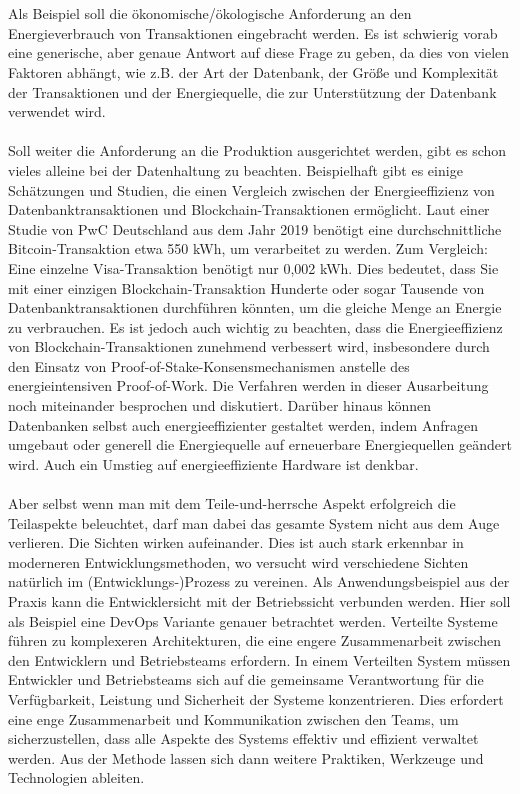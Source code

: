 \\\\
Als Beispiel soll die ökonomische/ökologische Anforderung an den Energieverbrauch von Transaktionen eingebracht werden. Es ist schwierig vorab eine generische, aber genaue Antwort auf diese Frage zu geben, da dies von vielen Faktoren abhängt, wie z.B. der Art der Datenbank, der Größe und Komplexität der Transaktionen und der Energiequelle, die zur Unterstützung der Datenbank verwendet wird.
\\\\
Soll weiter die Anforderung an die  Produktion ausgerichtet werden, gibt es schon vieles alleine bei der Datenhaltung zu beachten. Beispielhaft gibt es einige Schätzungen und Studien, die einen Vergleich zwischen der Energieeffizienz von Datenbanktransaktionen und Blockchain-Transaktionen ermöglicht. Laut einer Studie von PwC Deutschland aus dem Jahr 2019\cite{pwc2019} benötigt eine durchschnittliche Bitcoin-Transaktion etwa 550 kWh, um verarbeitet zu werden. Zum Vergleich: Eine einzelne Visa-Transaktion benötigt nur 0,002 kWh. Dies bedeutet, dass Sie mit einer einzigen Blockchain-Transaktion Hunderte oder sogar Tausende von Datenbanktransaktionen durchführen könnten, um die gleiche Menge an Energie zu verbrauchen.
Es ist jedoch auch wichtig zu beachten, dass die Energieeffizienz von Blockchain-Transaktionen zunehmend verbessert wird, insbesondere durch den Einsatz von Proof-of-Stake-Konsensmechanismen anstelle des energieintensiven Proof-of-Work. Die Verfahren werden in dieser Ausarbeitung noch miteinander besprochen und diskutiert. Darüber hinaus können Datenbanken selbst auch energieeffizienter gestaltet werden, indem Anfragen umgebaut oder generell die Energiequelle auf erneuerbare Energiequellen geändert wird. Auch ein Umstieg auf energieeffiziente Hardware ist denkbar. 
\\\\ 
Aber selbst wenn man mit dem Teile-und-herrsche Aspekt erfolgreich die Teilaspekte beleuchtet, darf man dabei das gesamte System nicht aus dem Auge verlieren. Die Sichten wirken aufeinander. Dies ist auch stark erkennbar in moderneren Entwicklungsmethoden, wo versucht wird verschiedene Sichten natürlich im (Entwicklungs-)Prozess zu vereinen. Als Anwendungsbeispiel aus der Praxis kann die Entwicklersicht mit der Betriebssicht verbunden werden. Hier soll als Beispiel eine DevOps\cite{kumar2016devops} Variante genauer betrachtet werden. 
Verteilte Systeme führen zu komplexeren Architekturen, die eine engere Zusammenarbeit zwischen den Entwicklern und Betriebsteams erfordern. In einem Verteilten System müssen Entwickler und Betriebsteams sich auf die gemeinsame Verantwortung für die Verfügbarkeit, Leistung und Sicherheit der Systeme konzentrieren. Dies erfordert eine enge Zusammenarbeit und Kommunikation zwischen den Teams, um sicherzustellen, dass alle Aspekte des Systems effektiv und effizient verwaltet werden. Aus der Methode lassen sich dann weitere Praktiken, Werkzeuge und Technologien ableiten. 
